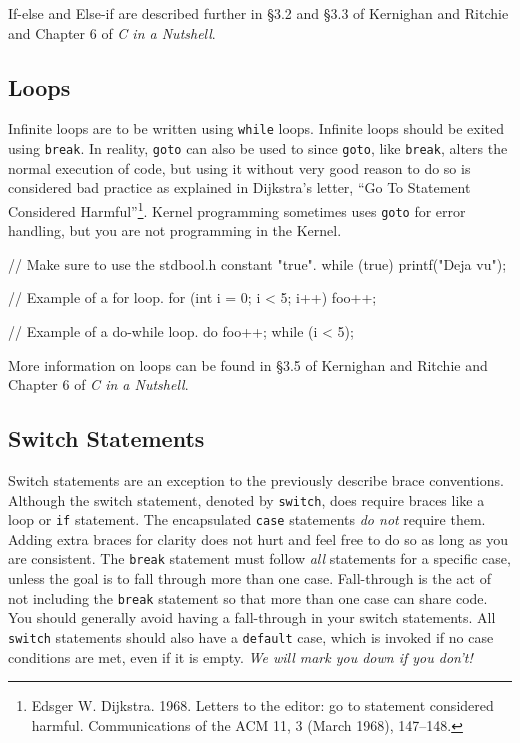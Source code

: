 \documentclass[11pt]{article}
\begin{document}
If-else and Else-if are described further in \S 3.2 and \S 3.3 of Kernighan and
Ritchie and Chapter 6 of \emph{C in a Nutshell}.


\subsection{Loops}

Infinite loops are to be written using \texttt{while} loops. Infinite loops
should be exited using \texttt{break}. In reality, \texttt{goto} can also be
used to since \texttt{goto}, like \texttt{break}, alters the normal execution of
code, but using it without very good reason to do so is considered bad practice
as explained in Dijkstra's letter, ``Go To Statement Considered
Harmful''\footnote{Edsger W. Dijkstra. 1968. Letters to the editor: go to
  statement considered harmful. Communications of the ACM 11, 3 (March 1968),
147--148.}. Kernel programming sometimes uses \texttt{goto} for error handling,
but you are not programming in the Kernel.

\begin{clisting}{}
// Make sure to use the stdbool.h constant "true".
while (true) {
    printf("Deja vu");
}

// Example of a for loop.
for (int i = 0; i < 5; i++) {
    foo++;
}

// Example of a do-while loop.
do {
    foo++;
} while (i < 5);
\end{clisting}

 More information on loops can be found in \S 3.5 of Kernighan and Ritchie and
Chapter 6 of \emph{C in a Nutshell}.


\subsection{Switch Statements}

Switch statements are an exception to the previously describe brace conventions.
Although the switch statement, denoted by \texttt{switch}, does require braces
like a loop or \texttt{if} statement. The encapsulated \texttt{case} statements
\emph{do not} require them. Adding extra braces for clarity does not hurt and
feel free to do so as long as you are consistent. The \texttt{break} statement
must follow \emph{all} statements for a specific case, unless the goal is to
fall through more than one case.  Fall-through is the act of not including the
\texttt{break} statement so that more than one case can share code. You should
generally avoid having a fall-through in your switch statements. All
\texttt{switch} statements should also have a \texttt{default} case, which is
invoked if no case conditions are met, even if it is empty. \emph{We will mark you down if you don't!}
\end{document}
